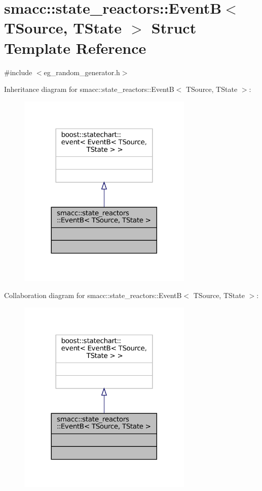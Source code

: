 \hypertarget{structsmacc_1_1state__reactors_1_1EventB}{}\section{smacc\+:\+:state\+\_\+reactors\+:\+:EventB$<$ T\+Source, T\+State $>$ Struct Template Reference}
\label{structsmacc_1_1state__reactors_1_1EventB}


{\ttfamily \#include $<$eg\+\_\+random\+\_\+generator.\+h$>$}



Inheritance diagram for smacc\+:\+:state\+\_\+reactors\+:\+:EventB$<$ T\+Source, T\+State $>$\+:
\nopagebreak
\begin{figure}[H]
\begin{center}
\leavevmode
\includegraphics[width=236pt]{structsmacc_1_1state__reactors_1_1EventB__inherit__graph}
\end{center}
\end{figure}


Collaboration diagram for smacc\+:\+:state\+\_\+reactors\+:\+:EventB$<$ T\+Source, T\+State $>$\+:
\nopagebreak
\begin{figure}[H]
\begin{center}
\leavevmode
\includegraphics[width=236pt]{structsmacc_1_1state__reactors_1_1EventB__coll__graph}
\end{center}
\end{figure}


